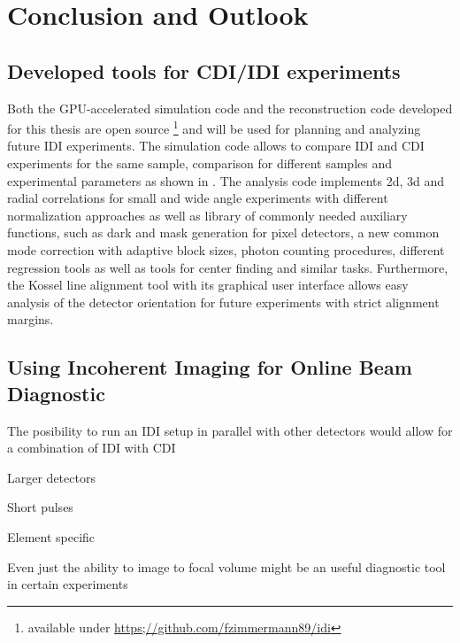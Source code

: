 \chapter{Conclusion and Outlook}

\section{Developed tools for CDI/IDI experiments}
Both the GPU-accelerated simulation code and the reconstruction code developed for this thesis are open source \footnote{available under \url{https;//github.com/fzimmermann89/idi}} and will be used for planning and analyzing future IDI experiments. The simulation code allows to compare IDI and CDI experiments for the same sample, comparison for different samples and experimental parameters as shown in .
The analysis code implements 2d, 3d and radial correlations for small and wide angle experiments with different normalization approaches as well as library of commonly needed auxiliary functions, such as dark and mask generation for pixel detectors, a new common mode correction with adaptive block sizes, photon counting procedures, different regression tools as well as tools for center finding and similar tasks.
Furthermore, the Kossel line alignment tool with its graphical user interface allows easy analysis of the detector orientation for future experiments with strict alignment margins.


\section{Using Incoherent Imaging for Online Beam Diagnostic}



The posibility to run an IDI setup in parallel with other detectors would allow for a combination of IDI with CDI

Larger detectors

Short pulses

Element specific 


Even just the ability to image to focal volume might be an useful diagnostic tool in certain experiments




